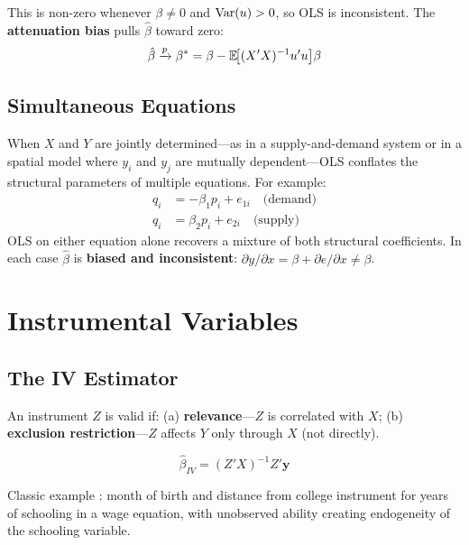 This is non-zero whenever $\beta \neq 0$ and $\operatorname{Var}(u) > 0$, so OLS is
inconsistent. The \textbf{attenuation bias} pulls
$\hat\beta$ toward zero:
\begin{equation}
  \hat\beta \xrightarrow{p} \beta^* = \beta - \mathbb{E}\!\bigl[(X'X)^{-1}u'u\bigr]\beta
\end{equation}

\subsection{Simultaneous Equations}

When $X$ and $Y$ are jointly determined---as in a supply-and-demand system
or in a spatial model where $y_i$ and $y_j$ are mutually dependent---OLS
conflates the structural parameters of multiple equations. For example:
\begin{align*}
  q_i &= -\beta_1 p_i + e_{1i} \quad\text{(demand)} \\
  q_i &= \beta_2 p_i + e_{2i} \quad\text{(supply)}
\end{align*}
OLS on either equation alone recovers a mixture of both structural
coefficients. In each case $\hat\beta$ is \textbf{biased and
inconsistent}:\; $\partial y/\partial x = \beta + \partial e/\partial x
\neq \beta$.


\section{Instrumental Variables}
\label{sec_IV}

\subsection{The IV Estimator}

An instrument $Z$ is valid if: (a) \textbf{relevance}---$Z$ is correlated
with $X$; (b) \textbf{exclusion restriction}---$Z$ affects $Y$ only through
$X$ (not directly).

\begin{tcolorbox}[keyresult]
\begin{equation}
  \hat\beta_{IV} = (Z'X)^{-1}Z'\mathbf{y}
  \label{eq_IV}
\end{equation}
\end{tcolorbox}

Classic example \citep{Angrist1991}: month of birth and distance from
college instrument for years of schooling in a wage equation, with unobserved
ability creating endogeneity of the schooling variable.

